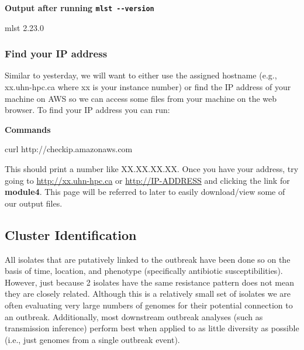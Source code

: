 \documentclass[
]{book}
\newenvironment{Shaded}{\begin{snugshade}}{\end{snugshade}}
\newcommand{\ExtensionTok}[1]{#1}
\newcommand{\NormalTok}[1]{#1}
\begin{document}
\textbf{Output after running \texttt{mlst\ -\/-version}}

\begin{Shaded}
\begin{Highlighting}[]
\ExtensionTok{mlst}\NormalTok{ 2.23.0}
\end{Highlighting}
\end{Shaded}

\subsubsection{Find your IP address}\label{find-your-ip-address}

Similar to yesterday, we will want to either use the assigned hostname (e.g., xx.uhn-hpc.ca where xx is your instance number) or find the IP address of your machine on AWS so we can access some files from your machine on the web browser. To find your IP address you can run:

\textbf{Commands}

\begin{Shaded}
\begin{Highlighting}[]
\ExtensionTok{curl}\NormalTok{ http://checkip.amazonaws.com}
\end{Highlighting}
\end{Shaded}

This should print a number like XX.XX.XX.XX. Once you have your address, try going to \url{http://xx.uhn-hpc.ca} or \url{http://IP-ADDRESS} and clicking the link for \textbf{module4}. This page will be referred to later to easily download/view some of our output files.

\subsection{Cluster Identification}\label{cluster}

All isolates that are putatively linked to the outbreak have been done so on the basis of time, location, and phenotype (specifically antibiotic susceptibilities). However, just because 2 isolates have the same resistance pattern does not mean they are closely related.
Although this is a relatively small set of isolates we are often evaluating very large numbers of genomes for their potential connection to an outbreak.
Additionally, most downstream outbreak analyses (such as transmission inference) perform best when applied to as little diversity as possible (i.e., just genomes from a single outbreak event).
\end{document}
